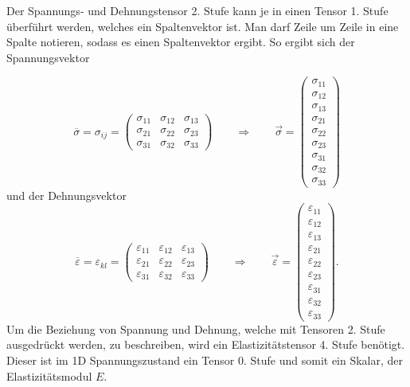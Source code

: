 Der Spannungs- und Dehnungstensor 2. Stufe kann je in einen Tensor 1. Stufe überführt werden, welches ein Spaltenvektor ist.
Man darf Zeile um Zeile in eine Spalte notieren, sodass es einen Spaltenvektor ergibt.
So ergibt sich der Spannungsvektor

\[
\overline{\sigma}
=
\sigma_{ij}
=
\begin{pmatrix}
	\sigma_{11} & \sigma_{12} & \sigma_{13} \\ 
	\sigma_{21} & \sigma_{22} & \sigma_{23} \\
	\sigma_{31} & \sigma_{32} & \sigma_{33}
\end{pmatrix}
\qquad
\Rightarrow
\qquad
\vec{\sigma}
=
\begin{pmatrix}
	\sigma_{11}\\
	\sigma_{12}\\
	\sigma_{13}\\
	\sigma_{21}\\
	\sigma_{22}\\
	\sigma_{23}\\
	\sigma_{31}\\
	\sigma_{32}\\
	\sigma_{33}
\end{pmatrix}
\]
und der Dehnungsvektor
\[
\overline{\varepsilon}
=
\varepsilon_{kl}
=
\begin{pmatrix}
	\varepsilon_{11} & \varepsilon_{12} & \varepsilon_{13} \\ 
	\varepsilon_{21} & \varepsilon_{22} & \varepsilon_{23} \\
	\varepsilon_{31} & \varepsilon_{32} & \varepsilon_{33}
\end{pmatrix}
\qquad
\Rightarrow
\qquad
\vec{\varepsilon}
=
\begin{pmatrix}
	\varepsilon_{11} \\
	\varepsilon_{12} \\
	\varepsilon_{13} \\
	\varepsilon_{21} \\
	\varepsilon_{22} \\
	\varepsilon_{23} \\
	\varepsilon_{31} \\
	\varepsilon_{32} \\
	\varepsilon_{33}
\end{pmatrix}
.
\]
Um die Beziehung von Spannung und Dehnung, welche mit Tensoren 2. Stufe ausgedrückt werden, zu beschreiben, wird ein Elastizitätstensor 4. Stufe benötigt.
Dieser ist im 1D Spannungszustand ein Tensor 0. Stufe und somit ein Skalar, der Elastizitätsmodul $E$.

